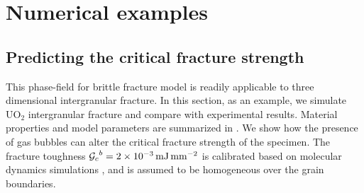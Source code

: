 \section{Numerical examples}
\label{section: Chapter3/examples}

\subsection{Predicting the critical fracture strength}

This phase-field for brittle fracture model is readily applicable to three dimensional intergranular fracture. In this section, as an example, we simulate UO$_2$ intergranular fracture and compare with experimental results. Material properties and model parameters are summarized in . We show how the presence of gas bubbles can alter the critical fracture strength of the specimen. The fracture toughness ${\mathcal{G}_c}^b = \SI{2e-3}{\milli\joule\per\square\milli\meter}$ is calibrated based on molecular dynamics simulations \cite{pritam_2016}, and is assumed to be homogeneous over the grain boundaries.


